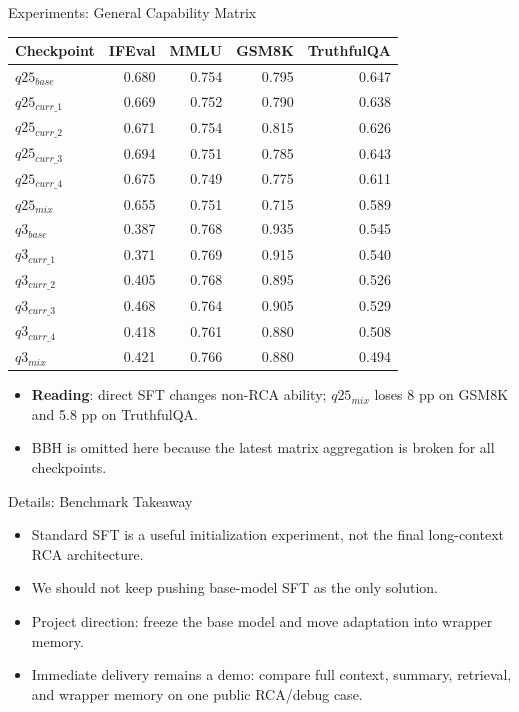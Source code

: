 \begin{frame}{Experiments: General Capability Matrix}
  \tiny
  \begin{table}
    \begin{tabular}{lrrrr}
      \toprule
      Checkpoint & IFEval & MMLU & GSM8K & TruthfulQA \\
      \midrule
      $q25_{base}$ & 0.680 & 0.754 & 0.795 & 0.647 \\
      $q25_{curr\_1}$ & 0.669 & 0.752 & 0.790 & 0.638 \\
      $q25_{curr\_2}$ & 0.671 & 0.754 & 0.815 & 0.626 \\
      $q25_{curr\_3}$ & 0.694 & 0.751 & 0.785 & 0.643 \\
      $q25_{curr\_4}$ & 0.675 & 0.749 & 0.775 & 0.611 \\
      $q25_{mix}$ & 0.655 & 0.751 & 0.715 & 0.589 \\
      $q3_{base}$ & 0.387 & 0.768 & 0.935 & 0.545 \\
      $q3_{curr\_1}$ & 0.371 & 0.769 & 0.915 & 0.540 \\
      $q3_{curr\_2}$ & 0.405 & 0.768 & 0.895 & 0.526 \\
      $q3_{curr\_3}$ & 0.468 & 0.764 & 0.905 & 0.529 \\
      $q3_{curr\_4}$ & 0.418 & 0.761 & 0.880 & 0.508 \\
      $q3_{mix}$ & 0.421 & 0.766 & 0.880 & 0.494 \\
      \bottomrule
    \end{tabular}
  \end{table}
  \normalsize
  \vspace{-0.4em}
  \begin{itemize}
    \item \textbf{Reading}: direct SFT changes non-RCA ability; $q25_{mix}$ loses 8 pp on GSM8K and 5.8 pp on TruthfulQA.
    \item BBH is omitted here because the latest matrix aggregation is broken for all checkpoints.
  \end{itemize}
\end{frame}

\begin{frame}{Details: Benchmark Takeaway}
  \begin{itemize}
    \item Standard SFT is a useful initialization experiment, not the final long-context RCA architecture.
    \item We should not keep pushing base-model SFT as the only solution.
    \item Project direction: freeze the base model and move adaptation into wrapper memory.
    \item Immediate delivery remains a demo: compare full context, summary, retrieval, and wrapper memory on one public RCA/debug case.
  \end{itemize}
\end{frame}

